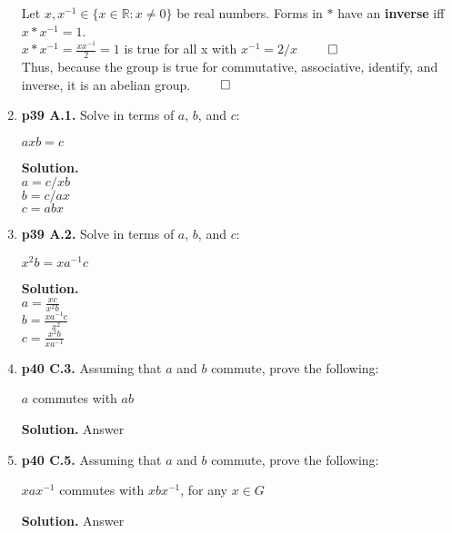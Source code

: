 \documentclass[11pt]{article}
\begin{document}
\begin{enumerate}
  Let $x,x^{-1} \in \{x \in \mathbb{R} : x \neq 0\}$ be real numbers. Forms in $*$ have an {\bfseries inverse} iff $x*x^{-1} = 1$. \\
  $x*x^{-1} = \frac{xx^{-1}}{2} = 1$ is true for all x with $x^{-1} = 2/x$ $\qed$\\
  
  Thus, because the group is true for commutative, associative, identify, and inverse, it is an abelian group. $\qed$\\
 
\item {\bfseries p39 A.1.}
  Solve in terms of $a$, $b$, and $c$:
  
  $axb = c$
  
  {\bfseries Solution.}\\
  $a = c/xb$\\
  $b = c/ax$\\
  $c = abx$\\
 
\item {\bfseries p39 A.2.}
  Solve in terms of $a$, $b$, and $c$:
  
  $x^2b = xa^{-1}c$
  
  {\bfseries Solution.}\\
  $a = \frac{xc}{x^2b}$\\
  $b = \frac{xa^{-1}c}{x^2}$\\
  $c = \frac{x^2b}{xa^{-1}}$\\
 
\item {\bfseries p40 C.3.}
  Assuming that $a$ and $b$ commute, prove the following:
  
  $a$ commutes with $ab$
  
  {\bfseries Solution.}
  Answer
 
\item {\bfseries p40 C.5.}
  Assuming that $a$ and $b$ commute, prove the following:
  
  $xax^{-1}$ commutes with $xbx^{-1}$, for any $x \in G$
  
  {\bfseries Solution.}
  Answer


\end{enumerate}
\end{document}
